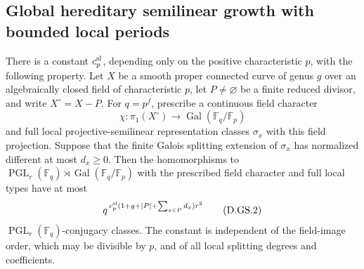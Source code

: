 \subsection{Global hereditary semilinear growth with bounded local periods}

\begin{lemma}
\label{D:curve-fixed-local-semilinear-growth-numerical}
There is a constant \(c_p^{\rm sl}\), depending only on
the positive characteristic \(p\), with the following
property. Let \(X\) be a smooth proper connected curve
of genus \(g\) over an algebraically closed field of
characteristic \(p\), let \(P\ne\varnothing\) be a finite
reduced divisor, and write \(X^\circ=X-P\).
For \(q=p^f\), prescribe a continuous field character
\[
 \chi:\pi_1(X^\circ)\longrightarrow
                   \operatorname{Gal}(\mathbb F_q/\mathbb F_p)
                                                        \tag{D.GS.1}
\]
and full local projective-semilinear representation
classes \(\sigma_x\) with this field projection.
Suppose that the finite Galois splitting extension of
\(\sigma_x\) has normalized different at most \(d_x\ge0\).
Then the homomorphisms to
\(\operatorname{PGL}_r(\mathbb F_q)\rtimes
\operatorname{Gal}(\mathbb F_q/\mathbb F_p)\)
with the prescribed field character and full local types
have at most
\[
 q^{\,c_p^{\rm sl}(1+g+|P|+\sum_{x\in P}d_x)r^2}
                                                        \tag{D.GS.2}
\]
\(\operatorname{PGL}_r(\mathbb F_q)\)-conjugacy classes.
The constant is independent of the field-image order,
which may be divisible by \(p\), and of all local
splitting degrees and coefficients.
\end{lemma}

